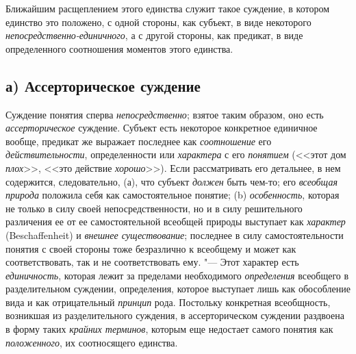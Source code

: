 {Ближайшим расщеплением этого единства служит такое суждение, в
котором единство это положено, с одной стороны, как субъект, в виде
некоторого
{\em непосредственно-единичного},
а с другой стороны, как предикат, в виде определенного
соотношения моментов этого единства.

\subsection[а) Ассерторическое суждение]{а) Ассерторическое суждение}
Суждение понятия сперва
{\em непосредственно};
взятое таким образом, оно есть
{\em ассерторическое}
суждение. Субъект есть некоторое конкретное единичное вообще,
предикат же выражает последнее как
{\em соотношение} его
{\em действительности},
определенности или
{\em характера} с его
{\em понятием} (<<этот дом
{\em плох}>>, <<это
действие {\em хорошо}>>).
Если рассматривать его детальнее, в нем содержится,
следовательно, (а), что субъект
{\em должен} быть чем-то;
его {\em всеобщая природа}
положила себя как самостоятельное понятие; (b)
{\em особенность},
которая не только в силу своей непосредственности, но и в
силу решительного различения ее от ее самостоятельной всеобщей природы
выступает как {\em характер}
(Beschaffenheit) и
{\em внешнее существование};
последнее в силу самостоятельности понятия с своей стороны
тоже безразлично к всеобщему и может как соответствовать, так и не
соответствовать ему. "--- Этот характер есть
{\em единичность},
которая лежит за пределами необходимого
{\em определения}
всеобщего в разделительном суждении, определения, которое
выступает лишь как обособление вида и как отрицательный
{\em принцип} рода.
Постольку конкретная всеобщность, возникшая из разделительного суждения, в
ассерторическом суждении раздвоена в форму таких
{\em крайних терминов},
которым еще недостает самого понятия как
{\em положенного}, их
соотносящего
единства.

}
